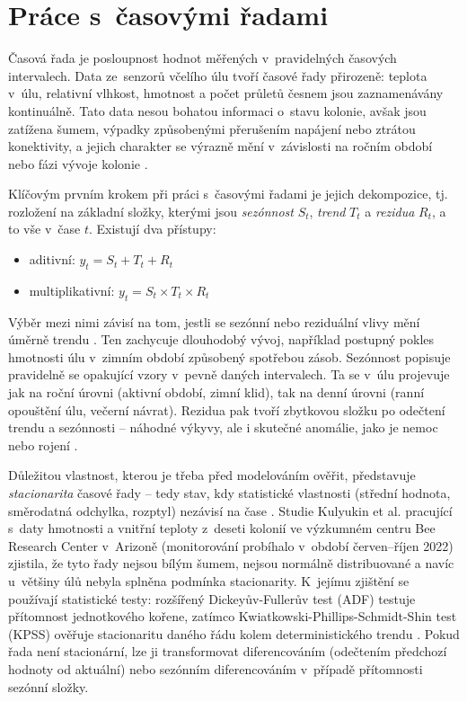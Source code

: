 \section{Práce s~časovými řadami}
Časová řada je posloupnost hodnot měřených v~pravidelných časových intervalech. Data ze~senzorů včelího úlu tvoří časové řady přirozeně: teplota v~úlu, relativní vlhkost, hmotnost a počet průletů česnem jsou zaznamenávány kontinuálně. Tato data nesou bohatou informaci o~stavu kolonie, avšak jsou zatížena šumem, výpadky způsobenými přerušením napájení nebo ztrátou konektivity, a jejich charakter se výrazně mění v~závislosti na ročním období nebo fázi vývoje kolonie \cite{Turyagyenda2025}.

Klíčovým prvním krokem při práci s~časovými řadami je jejich dekompozice, tj. rozložení na základní složky, kterými jsou \textit{sezónnost} \(S_t\), \textit{trend} \(T_t\) a \textit{rezidua} \(R_t\), a to vše v~čase \(t\). Existují dva přístupy: 

\begin{itemize}
    \item aditivní: \(y_t = S_t + T_t + R_t\)
    \item multiplikativní: \(y_t = S_t \times T_t \times R_t\)
\end{itemize}

Výběr mezi nimi závisí na tom, jestli se sezónní nebo reziduální vlivy mění úměrně trendu \cite{Hyndman2018}. Ten zachycuje dlouhodobý vývoj, například postupný pokles hmotnosti úlu v~zimním období způsobený spotřebou zásob. Sezónnost popisuje pravidelně se opakující vzory v~pevně daných intervalech. Ta se v~úlu projevuje jak na roční úrovni (aktivní období, zimní klid), tak na denní úrovni (ranní opouštění úlu, večerní návrat). Rezidua pak tvoří zbytkovou složku po odečtení trendu a sezónnosti -- náhodné výkyvy, ale i skutečné anomálie, jako je nemoc nebo rojení \cite{McMinnSauder2024}.

Důležitou vlastnost, kterou je třeba před modelováním ověřit, představuje \textit{stacionarita} časové řady -- tedy stav, kdy statistické vlastnosti (střední hodnota, směrodatná odchylka, rozptyl) nezávisí na čase \cite{Kulyukin2025}. Studie Kulyukin et al. \cite{Kulyukin2025} pracující s~daty hmotnosti a vnitřní teploty z~deseti kolonií ve výzkumném centru Bee Research Center v~Arizoně (monitorování probíhalo v~období červen--říjen 2022) zjistila, že tyto řady nejsou bílým šumem, nejsou normálně distribuované a navíc u~většiny úlů nebyla splněna podmínka stacionarity. K~jejímu zjištění se používají statistické testy: rozšířený Dickeyův-Fullerův test (ADF) testuje přítomnost jednotkového kořene, zatímco Kwiatkowski-Phillips-Schmidt-Shin test (KPSS) ověřuje stacionaritu daného řádu kolem deterministického trendu \cite{Kulyukin2025}. Pokud řada není stacionární, lze ji transformovat diferencováním (odečtením předchozí hodnoty od aktuální) nebo sezónním diferencováním v~případě přítomnosti sezónní složky.

